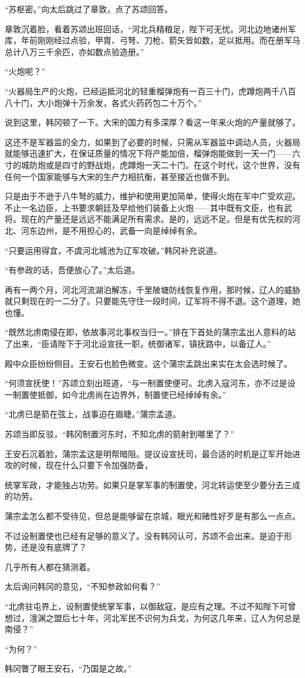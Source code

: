 “苏枢密。”向太后跳过了章敦，点了苏颂回答。

章敦沉着脸，看着苏颂出班回话，“河北兵精粮足，陛下可无忧。河北边地诸州军库，年前刚刚经过点验，甲胄、弓弩、刀枪、箭矢皆如数，足以抵用。而在册军马总计八万三千余匹，亦如数点验造册。”

“火炮呢？”

“火器局生产的火炮，已经运抵河北的轻重榴弹炮有一百三十门，虎蹲炮两千八百八十门，大小炮弹十万余发，各式火药药包二十万个。”

说到这里，韩冈顿了一下。大宋的国力有多深厚？看这一年来火炮的产量就够了。

这还不是军器监的全力，如果到了必要的时候，只需从军器监中调动人员，火器局就能够迅速扩大，在保证质量的情况下将产能加倍，榴弹炮能做到一天一门——六寸的城防炮或是四寸的野战炮，虎蹲炮一天二十门。在这个时代，这个世界，没有任何一个国家能够与大宋的生产力相抗衡，甚至接近也做不到。

只是由于不逊于八牛弩的威力，维护和使用更加简单，使得火炮在军中广受欢迎。不止一名边臣，上书要求朝廷及早给他们装备上火炮——其中既有文臣，也有武将。现在的产量还是远远不能满足所有需求。是的，远远不足。但是有优先权的河北、河东边州，是不用担心的，武备一向是绰绰有余。

“只要运用得宜，不虞河北城池为辽军攻破。”韩冈补充说道。

“有参政的话，吾便放心了。”太后道。

再有一两个月，河北河流湖泊解冻，千里陂塘防线恢复作用，那时候，辽人的威胁就只剩现在的一二分了。只要能先守住一段时间，辽军将不得不退。这个道理，她也懂。

“既然北虏南侵在即，依故事河北事权当归一。”排在下首处的蒲宗孟出人意料的站了出来，“臣请陛下于河北设宣抚一职，统御诸军，镇抚路中，以备辽人。”

殿中众臣纷纷侧目。王安石也脸色微变。这个蒲宗孟跳出来实在太会选时候了。

“何须宣抚使！”苏颂立刻出班道，“与一制置使便可。北虏入寇河东，亦不过是设一制置使抵御，如今北虏尚在边界外，制置使已经绰绰有余。”

“北虏已是箭在弦上，战事迫在眉睫。”蒲宗孟道。

苏颂当即反驳，“韩冈制置河东时，不知北虏的箭射到哪里了？”

王安石沉着脸，蒲宗孟这是明帮暗阻。提议设宣抚司，最合适的时机是辽军开始进攻的时候，现在什么只要下令加强防备，

统掌军政，才能独占功劳。如果只是掌军事的制置使，河北转运使至少要分去三成的功劳。

蒲宗孟怎么都不受待见，但总是能够留在京城，眼光和赌性好歹是有那么一点点。

不过设制置使也已经有足够的意义了。没有韩冈认可，苏颂不会出来。是迫于形势，还是没有底牌了？

几乎所有人都在猜测着。

太后询问韩冈的意见，“不知参政如何看？”

“北虏驻屯界上，设制置使统掌军事，以御敌寇，是应有之理。不过不知陛下可曾想过，澶渊之盟后七十年，河北军民不识何为兵戈，为何这几年来，辽人为何总是南侵？”

“为何？”

韩冈瞥了眼王安石，“乃国是之故。”
